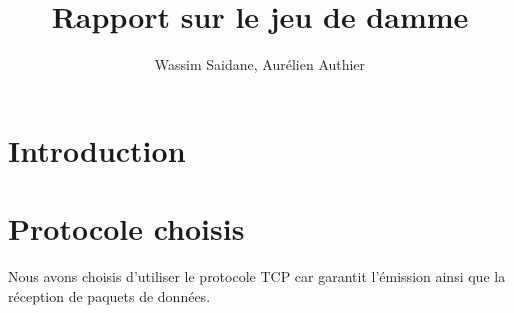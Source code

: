 \documentclass{article}
\title{Rapport sur le jeu de damme}
\author{Wassim Saidane, Aurélien Authier}
\date{}
\begin{document}
    \maketitle
    \tableofcontents
    \newpage
    \section{Introduction}

    \section{Protocole choisis}
        Nous avons choisis d'utiliser le protocole TCP car garantit l’émission ainsi que la réception de paquets de données.
\end{document}
